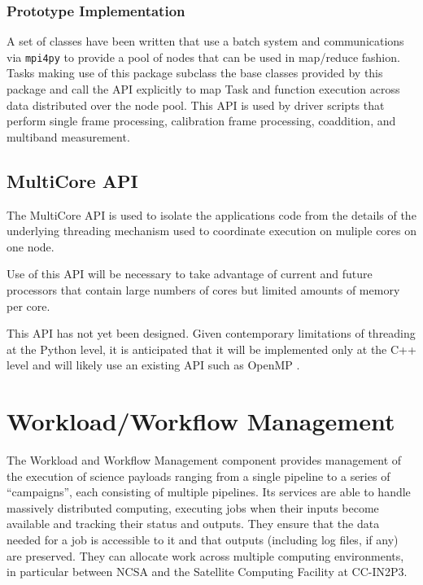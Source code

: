 \documentclass[DM,toc]{lsstdoc}
\begin{document}
\subsubsection{Prototype Implementation}\label{multinode-implementation}

A set of classes have been written that use a batch system and communications
via \texttt{mpi4py} \citep{mpi4py} to provide a pool of nodes that can be used
in map/reduce fashion.  Tasks making use of this package subclass the base
classes provided by this package and call the API explicitly to map Task and
function execution across data distributed over the node pool.  This API is
used by driver scripts that perform single frame processing, calibration frame
processing, coaddition, and multiband measurement.


\subsection{MultiCore API}\label{multicore-api}

The MultiCore API is used to isolate the applications code from the details of
the underlying threading mechanism used to coordinate execution on muliple
cores on one node.

Use of this API will be necessary to take advantage of current and future
processors that contain large numbers of cores but limited amounts of memory
per core.

This API has not yet been designed.  Given contemporary limitations of
threading at the Python level, it is anticipated that it will be implemented
only at the C++ level and will likely use an existing API such as OpenMP
\citep{OpenMP}.


\section{Workload/Workflow Management}\label{workload-workflow-management}

The Workload and Workflow Management component provides management of the
execution of science payloads ranging from a single pipeline to a series of
``campaigns'', each consisting of multiple pipelines. Its services are able to
handle massively distributed computing, executing jobs when their inputs become
available and tracking their status and outputs. They ensure that the data
needed for a job is accessible to it and that outputs (including log files, if
any) are preserved. They can allocate work across multiple computing
environments, in particular between NCSA and the Satellite Computing Facility
at CC-IN2P3.
\end{document}
